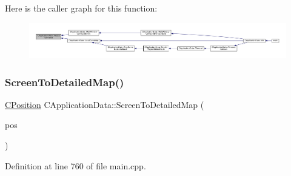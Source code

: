 Here is the caller graph for this function\+:
\nopagebreak
\begin{figure}[H]
\begin{center}
\leavevmode
\includegraphics[width=350pt]{classCApplicationData_ad8b16ccb099b4996ce9fee34a407c091_icgraph}
\end{center}
\end{figure}
\hypertarget{classCApplicationData_a5c8b0ebf35fddb89b22f035544c32222}{}\label{classCApplicationData_a5c8b0ebf35fddb89b22f035544c32222} 
\subsubsection{\texorpdfstring{Screen\+To\+Detailed\+Map()}{ScreenToDetailedMap()}}
{\footnotesize\ttfamily \hyperlink{classCPosition}{C\+Position} C\+Application\+Data\+::\+Screen\+To\+Detailed\+Map (\begin{DoxyParamCaption}\item[{const \hyperlink{classCPosition}{C\+Position} \&}]{pos }\end{DoxyParamCaption})\hspace{0.3cm}{\ttfamily [protected]}}



Definition at line 760 of file main.\+cpp.


